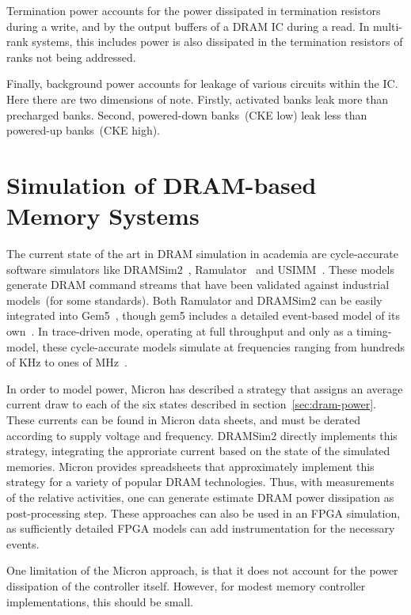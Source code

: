 Termination power accounts for the power dissipated in termination resistors
during a write, and by the output buffers of a DRAM IC during a read. In
multi-rank systems, this includes power is also dissipated in the termination
resistors of ranks not being addressed.

Finally, background power accounts for leakage of various circuits within the
IC. Here there are two dimensions of note. Firstly, activated banks
leak more than precharged banks. Second, powered-down banks~(CKE low) leak less
than powered-up banks~(CKE high).


\section{Simulation of DRAM-based Memory Systems}

The current state of the art in DRAM simulation in academia are cycle-accurate
software simulators like DRAMSim2~\cite{dramsim}, Ramulator~\cite{ramulator} and
USIMM~\cite{usimm}. These models generate DRAM command streams that have been
validated against industrial models~(for some standards). Both Ramulator and
DRAMSim2 can be easily integrated into Gem5~\cite{gem5}, though gem5 includes a
detailed event-based model of its own~\cite{gem5event}. In trace-driven mode,
operating at full throughput and only as a timing-model, these cycle-accurate
models simulate at frequencies ranging from hundreds of KHz to ones of
MHz~\cite{ramulator}.

In order to model power, Micron has described a strategy that assigns an
average current draw to each of the six states described in
section~\ref{sec:dram-power}. These currents can be found in Micron data
sheets, and must be derated according to supply voltage and frequency.
DRAMSim2 directly implements this strategy, integrating the approriate current
based on the state of the simulated memories. Micron provides spreadsheets that
approximately implement this strategy for a variety of popular DRAM
technologies. Thus, with measurements of the relative activities, one can
generate estimate DRAM power dissipation as post-processing step.  These
approaches can also be used in an FPGA simulation, as sufficiently detailed
FPGA models can add instrumentation for the necessary events.

One limitation of the Micron approach, is that it does not account for the
power dissipation of the controller itself. However, for modest memory
controller implementations, this should be small.
